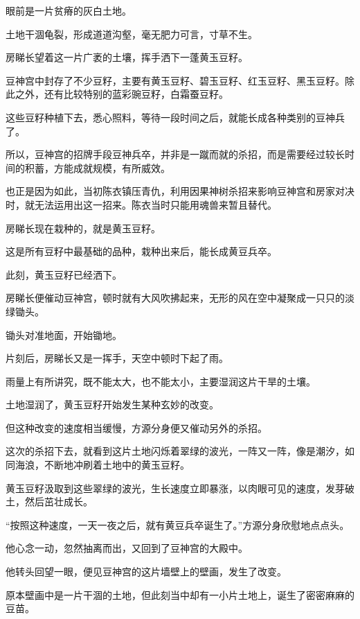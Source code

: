
\begin{this_body}



眼前是一片贫瘠的灰白土地。

土地干涸龟裂，形成道道沟壑，毫无肥力可言，寸草不生。

房睇长望着这一片广袤的土壤，挥手洒下一蓬黄玉豆籽。

豆神宫中封存了不少豆籽，主要有黄玉豆籽、碧玉豆籽、红玉豆籽、黑玉豆籽。除此之外，还有比较特别的蓝彩豌豆籽，白霜蚕豆籽。

这些豆籽种植下去，悉心照料，等待一段时间之后，就能长成各种类别的豆神兵了。

所以，豆神宫的招牌手段豆神兵卒，并非是一蹴而就的杀招，而是需要经过较长时间的积蓄，方能成就规模，有所威效。

也正是因为如此，当初陈衣镇压青仇，利用因果神树杀招来影响豆神宫和房家对决时，就无法运用出这一招来。陈衣当时只能用魂兽来暂且替代。

房睇长现在栽种的，就是黄玉豆籽。

这是所有豆籽中最基础的品种，栽种出来后，能长成黄豆兵卒。

此刻，黄玉豆籽已经洒下。

房睇长便催动豆神宫，顿时就有大风吹拂起来，无形的风在空中凝聚成一只只的淡绿锄头。

锄头对准地面，开始锄地。

片刻后，房睇长又是一挥手，天空中顿时下起了雨。

雨量上有所讲究，既不能太大，也不能太小，主要湿润这片干旱的土壤。

土地湿润了，黄玉豆籽开始发生某种玄妙的改变。

但这种改变的速度相当缓慢，方源分身便又催动另外的杀招。

这次的杀招下去，就看到这片土地闪烁着翠绿的波光，一阵又一阵，像是潮汐，如同海浪，不断地冲刷着土地中的黄玉豆籽。

黄玉豆籽汲取到这些翠绿的波光，生长速度立即暴涨，以肉眼可见的速度，发芽破土，然后茁壮成长。

“按照这种速度，一天一夜之后，就有黄豆兵卒诞生了。”方源分身欣慰地点点头。

他心念一动，忽然抽离而出，又回到了豆神宫的大殿中。

他转头回望一眼，便见豆神宫的这片墙壁上的壁画，发生了改变。

原本壁画中是一片干涸的土地，但此刻当中却有一小片土地上，诞生了密密麻麻的豆苗。


\end{this_body}
